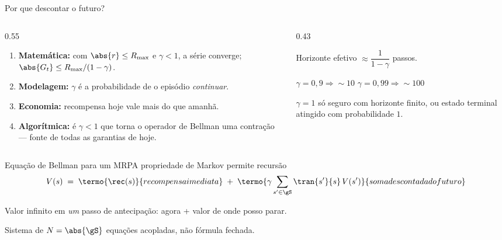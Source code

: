 \documentclass[aspectratio=169, 11pt]{beamer}
\newcommand{\Rmax}{R_{\max}}
\begin{document}
\begin{frame}{Por que descontar o futuro?}
  \begin{columns}[T]
    \begin{column}{0.55\textwidth}
      \begin{enumerate}\setlength{\itemsep}{0.7ex}
        \item \textbf{Matemática:} com $\abs{r} \le \Rmax$ e $\gamma<1$, a série
              converge; $\abs{G_t} \le \Rmax/(1-\gamma)$.
        \item \textbf{Modelagem:} $\gamma$ é a probabilidade de o episódio
              \emph{continuar}.
        \item \textbf{Economia:} recompensa hoje vale mais do que amanhã.
        \item \textbf{Algorítmica:} é $\gamma<1$ que torna o operador de Bellman uma
              \alert{contração} --- fonte de todas as garantias de hoje.
      \end{enumerate}
    \end{column}
    \begin{column}{0.43\textwidth}
      \begin{ideiabox}
        Horizonte efetivo $\approx \dfrac{1}{1-\gamma}$ passos.
        \smallskip

        $\gamma = 0{,}9 \Rightarrow \sim\!10$ \qquad
        $\gamma = 0{,}99 \Rightarrow \sim\!100$
      \end{ideiabox}
      \begin{alertabox}
        $\gamma = 1$ só seguro com horizonte finito, ou estado terminal atingido com
        probabilidade $1$.
      \end{alertabox}
    \end{column}
  \end{columns}
\end{frame}

\begin{frame}{Equação de Bellman para um MRP}{A propriedade de Markov permite recursão}
  \[
    V(s) \;=\; \termo{\rec(s)}{recompensa imediata}
    \;+\; \termo{\gamma \sum_{s' \in \gS} \tran{s'}{s}\, V(s')}{soma descontada do futuro}
  \]
  \vspace{0.4em}
  \begin{ideiabox}
    Valor infinito em \emph{um} passo de antecipação: agora + valor de onde posso parar.
  \end{ideiabox}
  \begin{alertabox}
    \alert{Sistema} de $N = \abs{\gS}$ equações acopladas, não fórmula fechada.
  \end{alertabox}
\end{frame}
\end{document}
